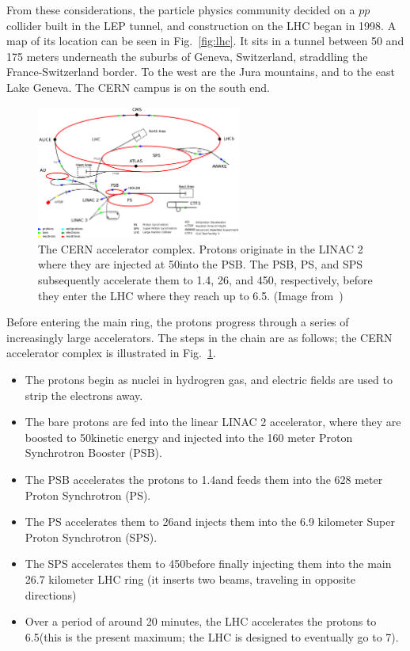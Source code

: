 From these considerations, the particle physics community 
decided on a $pp$ collider built in the LEP tunnel,
and construction on the LHC began in 1998. A map of its location can be seen in
Fig.~\ref{fig:lhc}. It sits in a tunnel between 50 and 175 meters underneath
the suburbs of Geneva, Switzerland, straddling the France-Switzerland border.
To the west are the Jura mountains, and to the east Lake Geneva. The CERN
campus is on the south end.

\begin{figure}[t]
  \begin{center}
    \includegraphics[width=0.60\textwidth]{figs/cms/accelerator_complex.png}
    \caption{The CERN accelerator complex. Protons originate in the LINAC 2 where they are 
      injected at 50\MeV into the PSB. The PSB, PS, and SPS subsequently accelerate them
      to 1.4\GeV, 26\GeV, and 450\GeV, respectively, before they enter the LHC where they
      reach up to 6.5\TeV. (Image from~\cite{accelerator_complex})
            }
    \label{fig:cern_accelerator_complex}
  \end{center}
\end{figure}

Before entering the main ring, the protons progress through a series of
increasingly large accelerators. The steps in the chain are as follows;
the CERN accelerator complex is
illustrated in Fig.~\ref{fig:cern_accelerator_complex}. 
\begin{itemize}\setlength\itemsep{-1mm}
\item The protons begin as nuclei in hydrogren gas, and electric fields are used to strip the electrons away.
\item The bare protons are fed into the linear LINAC 2 accelerator, where
they are boosted to 50\MeV kinetic energy and injected into the 160 meter
Proton Synchrotron Booster (PSB).
\item The PSB accelerates the protons to 1.4\GeV and feeds them into the
628 meter Proton Synchrotron (PS).
\item The PS accelerates them to 26\GeV and injects them into the
6.9 kilometer Super Proton Synchrotron (SPS).
\item The SPS accelerates them to 450\GeV before finally injecting
them into the main 26.7 kilometer LHC ring (it inserts two beams, traveling
in opposite directions)
\item Over a period of around 20 minutes, the LHC accelerates the protons
to 6.5\TeV (this is the present maximum; the LHC is designed to eventually
go to 7\TeV).
\end{itemize}

